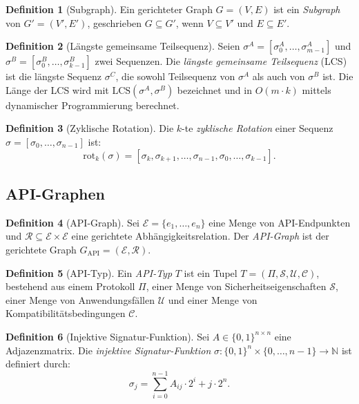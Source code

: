 ﻿\documentclass[a4paper,12pt]{article}
\theoremstyle{definition}
\newtheorem{definition}{Definition}
\begin{document}
\begin{definition}[Subgraph]
  Ein gerichteter Graph $G = (V, E)$ ist ein \emph{Subgraph} von
  $G' = (V', E')$, geschrieben $G \subseteq G'$, wenn
  $V \subseteq V'$ und $E \subseteq E'$.
\end{definition}

\begin{definition}[Längste gemeinsame Teilsequenz]
  Seien $\sigma^A = [\sigma_0^A, \ldots, \sigma_{m-1}^A]$ und
  $\sigma^B = [\sigma_0^B, \ldots, \sigma_{k-1}^B]$ zwei Sequenzen.
  Die \emph{längste gemeinsame Teilsequenz} (LCS) ist die längste Sequenz
  $\sigma^C$, die sowohl Teilsequenz von $\sigma^A$ als auch von $\sigma^B$ ist.
  Die Länge der LCS wird mit $\mathrm{LCS}(\sigma^A, \sigma^B)$ bezeichnet und
  in $O(m \cdot k)$ mittels dynamischer Programmierung berechnet.
\end{definition}

\begin{definition}[Zyklische Rotation]
  Die $k$-te \emph{zyklische Rotation} einer Sequenz
  $\sigma = [\sigma_0, \ldots, \sigma_{n-1}]$ ist:
  \[
    \mathrm{rot}_k(\sigma) = [\sigma_k, \sigma_{k+1}, \ldots, \sigma_{n-1},
    \sigma_0, \ldots, \sigma_{k-1}].
  \]
\end{definition}

\subsection{API-Graphen}

\begin{definition}[API-Graph]
  Sei $\mathcal{E} = \{e_1, \ldots, e_n\}$ eine Menge von API-Endpunkten und
  $\mathcal{R} \subseteq \mathcal{E} \times \mathcal{E}$ eine gerichtete
  Abhängigkeitsrelation. Der \emph{API-Graph} ist der gerichtete Graph
  $G_{\mathrm{API}} = (\mathcal{E}, \mathcal{R})$.
\end{definition}

\begin{definition}[API-Typ]
  Ein \emph{API-Typ} $T$ ist ein Tupel
  $T = (\Pi, \mathcal{S}, \mathcal{U}, \mathcal{C})$,
  bestehend aus einem Protokoll $\Pi$, einer Menge von Sicherheitseigenschaften
  $\mathcal{S}$, einer Menge von Anwendungsfällen $\mathcal{U}$ und einer Menge
  von Kompatibilitätsbedingungen $\mathcal{C}$.
\end{definition}

\begin{definition}[Injektive Signatur-Funktion]
  Sei $A \in \{0,1\}^{n \times n}$ eine Adjazenzmatrix. Die
  \emph{injektive Signatur-Funktion}
  $\sigma: \{0,1\}^n \times \{0,\ldots,n-1\} \to \mathbb{N}$ ist definiert durch:
  \[
    \sigma_j = \sum_{i=0}^{n-1} A_{ij} \cdot 2^i + j \cdot 2^n.
  \]
\end{definition}
\end{document}
